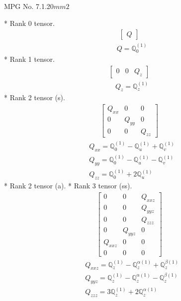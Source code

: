 \documentclass[fleqn,8pt,landscape]{jsarticle}
\begin{document}
\setcounter{MaxMatrixCols}{32}

\renewcommand{\tablename}{Table~}
\renewcommand{\figurename}{Figure~}
\begin{center}
\LARGE
MPG No. 7.1.20\quad$mm2$
\end{center}
* Rank 0 tensor.
\begin{align*}
\begin{bmatrix} Q \end{bmatrix}
\end{align*}
\begin{align*}
& Q = \mathbb{Q}_{0}^{(1)}
\end{align*}
* Rank 1 tensor.
\begin{align*}
\begin{bmatrix} 0 & 0 & Q_{z} \end{bmatrix}
\end{align*}
\begin{align*}
& Q_{z} = \mathbb{Q}_{z}^{(1)}
\end{align*}
* Rank 2 tensor (s).
\begin{align*}
\begin{bmatrix} Q_{xx} & 0 & 0 \\ 0 & Q_{yy} & 0 \\ 0 & 0 & Q_{zz} \end{bmatrix}
\end{align*}
\begin{align*}
& Q_{xx} = \mathbb{Q}_{0}^{(1)} - \mathbb{Q}_{u}^{(1)} + \mathbb{Q}_{v}^{(1)} \\
& Q_{yy} = \mathbb{Q}_{0}^{(1)} - \mathbb{Q}_{u}^{(1)} - \mathbb{Q}_{v}^{(1)} \\
& Q_{zz} = \mathbb{Q}_{0}^{(1)} + 2 \mathbb{Q}_{u}^{(1)}
\end{align*}
* Rank 2 tensor (a).
* Rank 3 tensor (ss).
\begin{align*}
\begin{bmatrix} 0 & 0 & Q_{xxz} \\ 0 & 0 & Q_{yyz} \\ 0 & 0 & Q_{zzz} \\ 0 & Q_{yyz} & 0 \\ Q_{xxz} & 0 & 0 \\ 0 & 0 & 0 \end{bmatrix}
\end{align*}
\begin{align*}
& Q_{xxz} = \mathbb{Q}_{z}^{(1)} - \mathbb{Q}_{z}^{\alpha(1)} + \mathbb{Q}_{z}^{\beta(1)} \\
& Q_{yyz} = \mathbb{Q}_{z}^{(1)} - \mathbb{Q}_{z}^{\alpha(1)} - \mathbb{Q}_{z}^{\beta(1)} \\
& Q_{zzz} = 3 \mathbb{Q}_{z}^{(1)} + 2 \mathbb{Q}_{z}^{\alpha(1)}
\end{align*}
\end{document}
